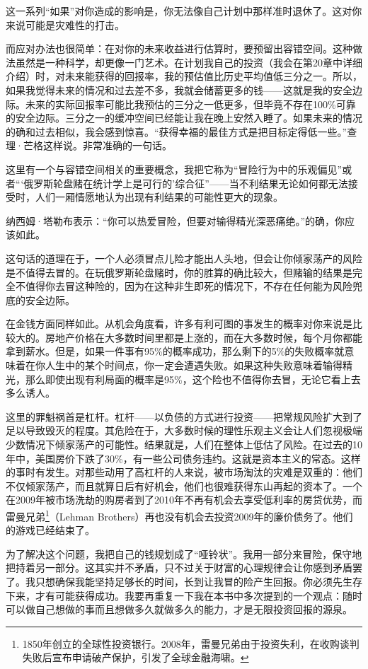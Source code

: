 这一系列“如果”对你造成的影响是，你无法像自己计划中那样准时退休了。这对你来说可能是灾难性的打击。

而应对办法也很简单：在对你的未来收益进行估算时，要预留出容错空间。这种做法虽然是一种科学，却更像一门艺术。在计划我自己的投资（我会在第20章中详细介绍）时，对未来能获得的回报率，我的预估值比历史平均值低三分之一。所以，如果我觉得未来的情况和过去差不多，我就会储蓄更多的钱——这就是我的安全边际。未来的实际回报率可能比我预估的三分之一低更多，但毕竟不存在100\%可靠的安全边际。三分之一的缓冲空间已经能让我在晚上安然入睡了。如果未来的情况的确和过去相似，我会感到惊喜。“获得幸福的最佳方式是把目标定得低一些。”查理·芒格这样说。非常准确的一句话。

这里有一个与容错空间相关的重要概念，我把它称为“冒险行为中的乐观偏见”或者“‘俄罗斯轮盘赌在统计学上是可行的’综合征”——当不利结果无论如何都无法接受时，人们一厢情愿地认为出现有利结果的可能性更大的现象。

纳西姆·塔勒布表示：“你可以热爱冒险，但要对输得精光深恶痛绝。”的确，你应该如此。

这句话的道理在于，一个人必须冒点儿险才能出人头地，但会让你倾家荡产的风险是不值得去冒的。在玩俄罗斯轮盘赌时，你的胜算的确比较大，但赌输的结果是完全不值得你去冒这种险的，因为在这种非生即死的情况下，不存在任何能为风险兜底的安全边际。

在金钱方面同样如此。从机会角度看，许多有利可图的事发生的概率对你来说是比较大的。房地产价格在大多数时间里都是上涨的，而在大多数时候，每个月你都能拿到薪水。但是，如果一件事有95\%的概率成功，那么剩下的5\%的失败概率就意味着在你人生中的某个时间点，你一定会遭遇失败。如果这种失败意味着输得精光，那么即使出现有利局面的概率是95\%，这个险也不值得你去冒，无论它看上去多么诱人。

这里的罪魁祸首是杠杆。杠杆——以负债的方式进行投资——把常规风险扩大到了足以导致毁灭的程度。其危险在于，大多数时候的理性乐观主义会让人们忽视极端少数情况下倾家荡产的可能性。结果就是，人们在整体上低估了风险。在过去的10年中，美国房价下跌了30\%，有一些公司债务违约。这就是资本主义的常态。这样的事时有发生。对那些动用了高杠杆的人来说，被市场淘汰的灾难是双重的：他们不仅倾家荡产，而且就算日后有好机会，他们也很难获得东山再起的资本了。一个在2009年被市场洗劫的购房者到了2010年不再有机会去享受低利率的房贷优势，而雷曼兄弟\footnote{1850年创立的全球性投资银行。2008年，雷曼兄弟由于投资失利，在收购谈判失败后宣布申请破产保护，引发了全球金融海啸。}（Lehman Brothers）再也没有机会去投资2009年的廉价债务了。他们的游戏已经结束了。

为了解决这个问题，我把自己的钱规划成了“哑铃状”。我用一部分来冒险，保守地把持着另一部分。这其实并不矛盾，只不过关于财富的心理规律会让你感到矛盾罢了。我只想确保我能坚持足够长的时间，长到让我冒的险产生回报。你必须先生存下来，才有可能获得成功。我要再重复一下我在本书中多次提到的一个观点：随时可以做自己想做的事而且想做多久就做多久的能力，才是无限投资回报的源泉。

